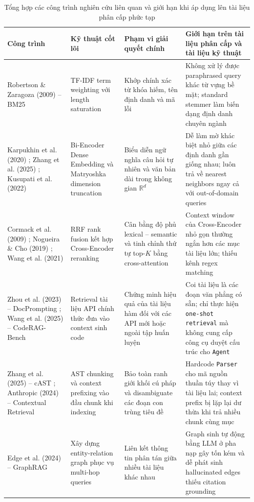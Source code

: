 \begin{table}[H]
\centering
\caption{Tổng hợp các công trình nghiên cứu liên quan và giới hạn khi áp dụng lên tài liệu phân cấp phức tạp}
\label{tab:related_work}
\footnotesize\setlength{\tabcolsep}{4pt}\begin{tabularx}{\textwidth}{>{\raggedright\arraybackslash}p{2.9cm}>{\raggedright\arraybackslash}p{3.1cm}>{\raggedright\arraybackslash}p{3.4cm}>{\raggedright\arraybackslash}X}
\toprule
\textbf{Công trình} & \textbf{Kỹ thuật cốt lõi} & \textbf{Phạm vi giải quyết chính} & \textbf{Giới hạn trên tài liệu phân cấp và tài liệu kỹ thuật} \\
\midrule
Robertson \& Zaragoza (2009) -- BM25 \cite{robertson2009bm25} & TF-IDF term weighting với length saturation & Khớp chính xác từ khóa hiếm, tên định danh và mã lỗi & Không xử lý được paraphrased query khác từ vựng bề mặt; standard stemmer làm biến dạng định danh chuyên ngành \\
\addlinespace[3pt]
Karpukhin et al. (2020) \cite{karpukhin2020dpr}; Zhang et al. (2025) \cite{zhang2025qwen3}; Kusupati et al. (2022) \cite{kusupati2022mrl} & Bi-Encoder Dense Embedding và Matryoshka dimension truncation & Biểu diễn ngữ nghĩa câu hỏi tự nhiên và văn bản dài trong không gian $\mathbb{R}^d$ & Dễ làm mờ khác biệt nhỏ giữa các định danh gần giống nhau; luôn trả về nearest neighbors ngay cả với out-of-domain queries \\
\addlinespace[3pt]
Cormack et al. (2009) \cite{cormack2009rrf}; Nogueira \& Cho (2019) \cite{nogueira2019bert}; Wang et al. (2021) \cite{wang2021minilm} & RRF rank fusion kết hợp Cross-Encoder reranking & Cân bằng độ phủ lexical -- semantic và tinh chỉnh thứ tự top-$K$ bằng cross-attention & Context window của Cross-Encoder nhỏ gọn thường ngắn hơn các mục tài liệu lớn; thiếu kênh regex matching \\
\addlinespace[3pt]
Zhou et al. (2023) -- DocPrompting \cite{zhou2023docprompting}; Wang et al. (2025) -- CodeRAG-Bench \cite{wang2025coderag} & Retrieval tài liệu API chính thức đưa vào context sinh code & Chứng minh hiệu quả của tài liệu hàm đối với các API mới hoặc ngoài tập huấn luyện & Coi tài liệu là các đoạn văn phẳng có sẵn; chỉ thực hiện \texttt{one-shot retrieval} mà không cung cấp công cụ duyệt cấu trúc cho \texttt{Agent} \\
\addlinespace[3pt]
Zhang et al. (2025) -- cAST \cite{zhang2025cast}; Anthropic (2024) -- Contextual Retrieval \cite{anthropic2024contextual} & AST chunking và context prefixing vào đầu chunk khi indexing & Bảo toàn ranh giới khối cú pháp và disambiguate các đoạn con trùng tiêu đề & Hardcode \texttt{Parser} cho mã nguồn thuần túy thay vì tài liệu lai; context prefix bị lặp lại dư thừa khi trả nhiều chunk cùng mục \\
\addlinespace[3pt]
Edge et al. (2024) -- GraphRAG \cite{edge2024graphrag} & Xây dựng entity-relation graph phục vụ multi-hop queries & Liên kết thông tin phân tán giữa nhiều tài liệu khác nhau & Graph sinh tự động bằng LLM ở pha nạp gây tốn kém và dễ phát sinh hallucinated edges thiếu citation grounding \\
\bottomrule
\end{tabularx}
\end{table}

